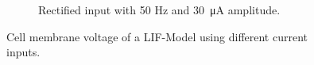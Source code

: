 \documentclass{scrartcl}			%
\begin{document}
\begin{figure}[h]
\begin{subfigure}[b]{0.5\linewidth}
    \caption{Rectified input with 50 Hz and \SI{30}{\micro\ampere} amplitude.} 
    \label{fig:30rect} 
    \end{subfigure} 
  \caption{Cell membrane voltage of a LIF-Model using different current inputs.}
  \label{fig:LIF} 
\end{figure}
\end{document}
